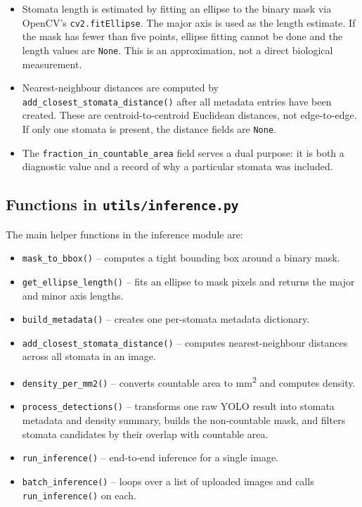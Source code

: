 \documentclass{article}
\begin{document}
\begin{itemize}
    \item Stomata length is estimated by fitting an ellipse to the binary mask via OpenCV's \texttt{cv2.fitEllipse}. The major axis is used as the length estimate. If the mask has fewer than five points, ellipse fitting cannot be done and the length values are \texttt{None}. This is an approximation, not a direct biological measurement.
    \item Nearest-neighbour distances are computed by \texttt{add\_closest\_stomata\_distance()} after all metadata entries have been created. These are centroid-to-centroid Euclidean distances, not edge-to-edge. If only one stomata is present, the distance fields are \texttt{None}.
    \item The \texttt{fraction\_in\_countable\_area} field serves a dual purpose: it is both a diagnostic value and a record of why a particular stomata was included.
\end{itemize}

\subsection{Functions in \texttt{utils/inference.py}}

The main helper functions in the inference module are:

\begin{itemize}
    \item \texttt{mask\_to\_bbox()} -- computes a tight bounding box around a binary mask.
    \item \texttt{get\_ellipse\_length()} -- fits an ellipse to mask pixels and returns the major and minor axis lengths.
    \item \texttt{build\_metadata()} -- creates one per-stomata metadata dictionary.
    \item \texttt{add\_closest\_stomata\_distance()} -- computes nearest-neighbour distances across all stomata in an image.
    \item \texttt{density\_per\_mm2()} -- converts countable area to mm\textsuperscript{2} and computes density.
    \item \texttt{process\_detections()} -- transforms one raw YOLO result into stomata metadata and density summary, builds the non-countable mask, and filters stomata candidates by their overlap with countable area.
    \item \texttt{run\_inference()} -- end-to-end inference for a single image.
    \item \texttt{batch\_inference()} -- loops over a list of uploaded images and calls \texttt{run\_inference()} on each.
\end{itemize}
\end{document}
